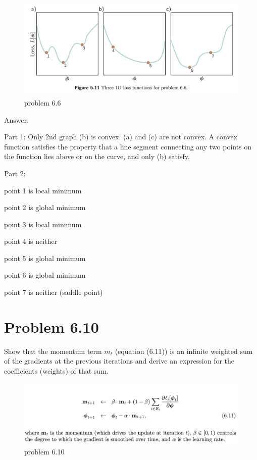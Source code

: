 \documentclass[10pt]{article}
\begin{document}
\begin{figure}[h]
    \centering
    \includegraphics[width=1\textwidth]{figure.png}
    \caption{problem 6.6}
    \label{fig:problem66}
\end{figure}


\noindent Answer: 


\noindent Part 1: Only 2nd graph (b) is convex. (a) and  (c) are not convex. A convex function satisfies the property that a line segment connecting any two points on the function lies above or on the curve, and only (b) satisfy. 

\noindent Part 2: 

\noindent point 1 is local minimum 

\noindent point 2 is global minimum 

\noindent point 3 is local minimum 

\noindent point 4 is neither

\noindent point 5 is global minimum 

\noindent point 6 is global minimum 

\noindent point 7 is neither (saddle point) 




\vspace{5em}

\newpage

\section*{Problem 6.10}

Show that the momentum term \( m_t \) (equation (6.11)) is an infinite weighted sum of the gradients at the previous iterations and derive an expression for the coefficients (weights) of that sum.


\begin{figure}[h]
    \centering
    \includegraphics[width=1\textwidth]{equation.png}
    \caption{problem 6.10}
    \label{fig:problem610}
\end{figure}
\end{document}

